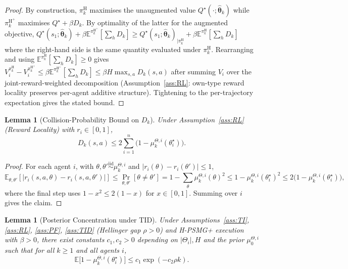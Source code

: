 \documentclass{article}
\newtheorem{lemma}[theorem]{Lemma}
\def\textsuperscript#1{#1}%
\begin{document}
\begin{proof}
By construction, $\pi_k^{\mathrm{H}}$ maximises the unaugmented value $Q^\star(\cdot; \hat{\boldsymbol\theta}_k)$ while $\pi_k^{\mathrm{H}^+}$ maximises $Q^\star + \beta D_k$. By optimality of the latter for the augmented objective,
$Q^\star(s_1; \hat{\boldsymbol\theta}_k) + \beta \mathbb{E}^{\pi_k^{\mathrm{H}^+}}[\sum_h D_k] \geq Q^\star(s_1; \hat{\boldsymbol\theta}_k)_{|\pi_k^{\mathrm{H}}} + \beta \mathbb{E}^{\pi_k^{\mathrm{H}}}[\sum_h D_k]$
where the right-hand side is the same quantity evaluated under $\pi_k^{\mathrm{H}}$. Rearranging and using $\mathbb{E}^{\pi_k^{\mathrm{H}}}[\sum_h D_k] \geq 0$ gives
$V_i^{\pi_k^{\mathrm{H}}} - V_i^{\pi_k^{\mathrm{H}^+}} \leq \beta \mathbb{E}^{\pi_k^{\mathrm{H}^+}}[\sum_h D_k] \leq \beta H \max_{s, a} D_k(s, a)$
after summing $V_i$ over the joint-reward-weighted decomposition (Assumption~\ref{ass:RL}: own-type reward locality preserves per-agent additive structure). Tightening to the per-trajectory expectation gives the stated bound.
\end{proof}

\begin{lemma}[Collision-Probability Bound on $D_k$]
\label{lem:collision-bound}
Under Assumption~\ref{ass:RL} (Reward Locality) with $r_i \in [0, 1]$,
\begin{equation}
D_k(s, a) \leq 2 \sum_{i=1}^n \big(1 - \mu_k^{\Theta, i}(\theta_i^\star)\big).
\end{equation}
\end{lemma}

\begin{proof}
For each agent $i$, with $\theta, \theta' \stackrel{\mathrm{iid}}{\sim} \mu_k^{\Theta, i}$ and $|r_i(\theta) - r_i(\theta')| \leq 1$,
\begin{equation}
\mathbb{E}_{\theta, \theta'}[|r_i(s,a,\theta) - r_i(s,a,\theta')|] \leq \Pr_{\theta, \theta'}[\theta \neq \theta'] = 1 - \sum_{\theta} \mu_k^{\Theta, i}(\theta)^2 \leq 1 - \mu_k^{\Theta, i}(\theta_i^\star)^2 \leq 2\big(1 - \mu_k^{\Theta, i}(\theta_i^\star)\big),
\end{equation}
where the final step uses $1 - x^2 \leq 2(1 - x)$ for $x \in [0, 1]$. Summing over $i$ gives the claim.
\end{proof}

\begin{lemma}[Posterior Concentration under TID]
\label{lem:tid-concentration}
Under Assumptions~\ref{ass:TI}, \ref{ass:RL}, \ref{ass:PF}, \ref{ass:TID} (Hellinger gap $\rho > 0$) and H-PSMG\textsuperscript{+} execution with $\beta > 0$, there exist constants $c_1, c_2 > 0$ depending on $|\Theta_i|, H$ and the prior $\mu_0^{\Theta, i}$ such that for all $k \geq 1$ and all agents $i$,
\begin{equation}
\mathbb{E}\big[1 - \mu_k^{\Theta, i}(\theta_i^\star)\big] \leq c_1 \exp(-c_2 \rho k).
\end{equation}
\end{lemma}
\end{document}
